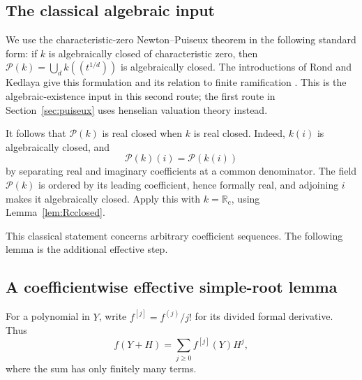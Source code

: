 \documentclass[11pt,letterpaper]{article}
\numberwithin{equation}{section}
\theoremstyle{definition}
\theoremstyle{remark}
\newcommand{\PP}{\mathcal P}
\newcommand{\Rc}{\mathbb R_{\mathrm c}}
\begin{document}
\subsection{The classical algebraic input}

We use the characteristic-zero Newton--Puiseux theorem in the following
standard form: if $k$ is algebraically closed of characteristic zero, then
$\PP(k)=\bigcup_d k((t^{1/d}))$ is algebraically closed. The introductions of Rond and Kedlaya give this formulation and its relation
to finite ramification \cite{rond,kedlaya}. This is the algebraic-existence input in this second route; the first
route in Section~\ref{sec:puiseux} uses henselian valuation theory instead.

It follows that $\PP(k)$ is real closed when $k$ is real closed. Indeed,
$k(i)$ is algebraically closed, and
\[
 \PP(k)(i)=\PP(k(i))
\]
by separating real and imaginary coefficients at a common denominator.
The field $\PP(k)$ is ordered by its leading coefficient, hence formally
real, and adjoining $i$ makes it algebraically closed. Apply this with
$k=\Rc$, using Lemma~\ref{lem:Rcclosed}.

This classical statement concerns arbitrary coefficient sequences. The
following lemma is the additional effective step.

\subsection{A coefficientwise effective simple-root lemma}

For a polynomial in $Y$, write $f^{[j]}=f^{(j)}/j!$ for its divided formal
derivative. Thus
\[
 f(Y+H)=\sum_{j\geq0}f^{[j]}(Y)H^j,
\]
where the sum has only finitely many terms.
\end{document}
